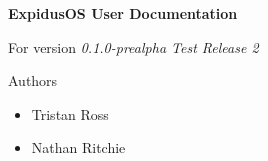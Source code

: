 \begin{titlepage}
	\begin{center}
		\vspace*{5cm}
		\huge\textbf{ExpidusOS User Documentation}\normalsize

		\vspace{0.5cm}
		For version \textit{0.1.0-prealpha Test Release 2}

		\vspace{5cm}
		\large
		Authors
		\normalsize
		\begin{itemize}
			\item Tristan Ross
			\item Nathan Ritchie
		\end{itemize}
	\end{center}
\end{titlepage}
